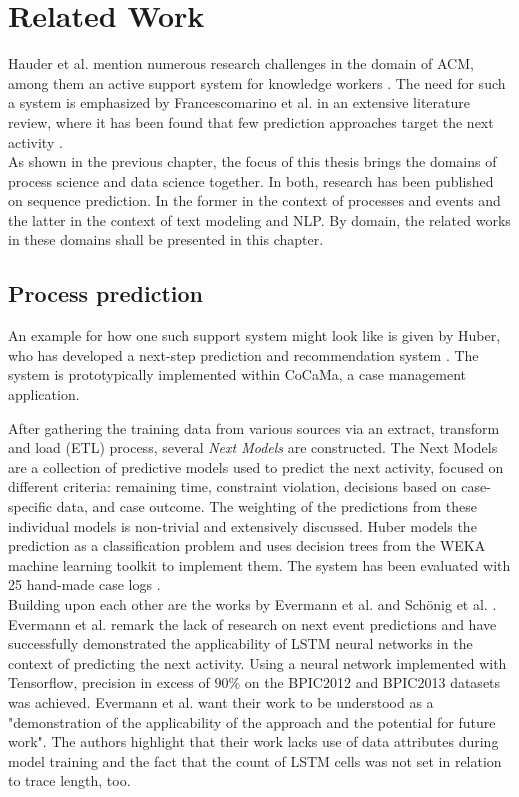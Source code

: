 \chapter{Related Work}\label{sec:related-work}
Hauder et al. mention numerous research challenges in the domain of ACM, among them an active support system for knowledge workers \cite{hauder2014}.
The need for such a system is emphasized by Francescomarino et al. in an extensive literature review, where it has been found that few prediction approaches target the next activity \cite{francescomarino2018}.\\

As shown in the previous chapter, the focus of this thesis brings the domains of process science and data science together. In both, research has been published on sequence prediction. In the former in the context of processes and events and the latter in the context of text modeling and NLP. By domain, the related works in these domains shall be presented in this chapter.

\section{Process prediction}
An example for how one such support system \cite{hauder2014} might look like is given by Huber, who has developed a next-step prediction and recommendation system  \cite{huber2015}. The system is prototypically implemented within CoCaMa, a case management application.

After gathering the training data from various sources via an extract, transform and load (ETL) process, several \textit{Next Models} are constructed. The Next Models are a collection of predictive models used to predict the next activity, focused on different criteria: remaining time, constraint violation, decisions based on case-specific data, and case outcome. The weighting of the predictions from these individual models is non-trivial and extensively discussed. Huber models the prediction as a classification problem and uses decision trees from the WEKA \cite{web:weka} machine learning toolkit to implement them. The system has been evaluated with 25 hand-made case logs \cite{huber2015}.\\

Building upon each other are the works by Evermann et al. \cite{evermann2016} and Schönig et al. \cite{schoenig2018}. Evermann et al. remark the lack of research on next event predictions and have successfully demonstrated the applicability of LSTM neural networks in the context of predicting the next activity. Using a neural network implemented with Tensorflow, precision in excess of $90\%$ on the BPIC2012 and BPIC2013 datasets was achieved. Evermann et al. want their work to be understood as a "demonstration of the applicability of the approach and the potential for future work". The authors highlight that their work lacks use of data attributes during model training and the fact that the count of LSTM cells was not set in relation to trace length, too.

